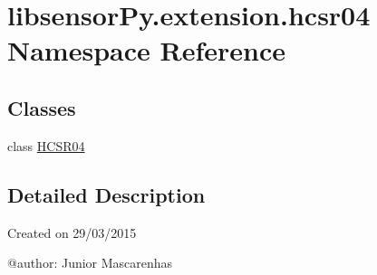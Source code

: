 \hypertarget{namespacelibsensorPy_1_1extension_1_1hcsr04}{}\section{libsensor\+Py.\+extension.\+hcsr04 Namespace Reference}
\label{namespacelibsensorPy_1_1extension_1_1hcsr04}
\subsection*{Classes}
\begin{DoxyCompactItemize}
\item 
class \hyperlink{classlibsensorPy_1_1extension_1_1hcsr04_1_1HCSR04}{H\+C\+S\+R04}
\end{DoxyCompactItemize}


\subsection{Detailed Description}
\begin{DoxyVerb}Created on 29/03/2015

@author: Junior Mascarenhas
\end{DoxyVerb}
 